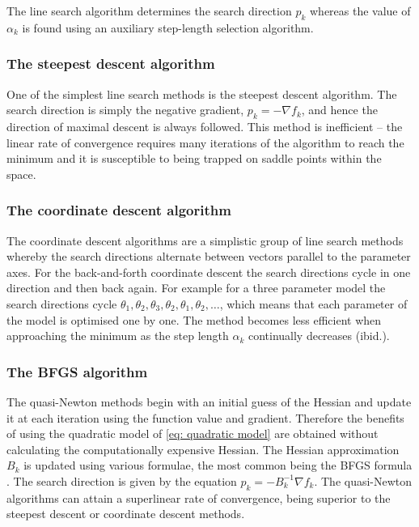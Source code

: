 \noindent  The line search algorithm determines the search direction $p_k$ whereas the value of $\alpha_k$ is found using an auxiliary step-length selection algorithm.


\subsubsection{The steepest descent algorithm}

One of the simplest line search methods is the steepest descent algorithm.  The search direction is simply the negative gradient, $p_k = -\nabla f_k$, and hence the direction of maximal descent is always followed.  This method is inefficient -- the linear rate of convergence requires many iterations of the algorithm to reach the minimum and it is susceptible to being trapped on saddle points within the space.


\subsubsection{The coordinate descent algorithm}

The coordinate descent algorithms are a simplistic group of line search methods whereby the search directions alternate between vectors parallel to the parameter axes.  For the back-and-forth coordinate descent the search directions cycle in one direction and then back again.  For example for a three parameter model the search directions cycle $\theta_1, \theta_2, \theta_3, \theta_2, \theta_1, \theta_2, \hdots$, which means that each parameter of the model is optimised one by one.  The method becomes less efficient when approaching the minimum as the step length $\alpha_k$ continually decreases (ibid.).


\subsubsection{The BFGS algorithm}

The quasi-Newton methods begin with an initial guess of the Hessian and update it at each iteration using the function value and gradient.  Therefore the benefits of using the quadratic model of \eqref{eq: quadratic model} are obtained without calculating the computationally expensive Hessian.  The Hessian approximation $B_k$ is updated using various formulae, the most common being the BFGS formula \citep{Broyden70,Fletcher70,Goldfarb70,Shanno70}.  The search direction is given by the equation $p_k = -B_k^{-1} \nabla f_k$.  The quasi-Newton algorithms can attain a superlinear rate of convergence, being superior to the steepest descent or coordinate descent methods.


